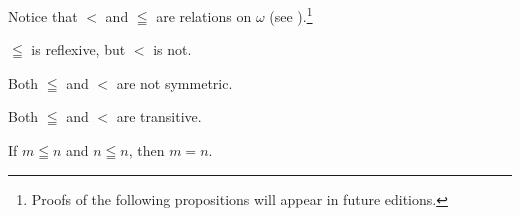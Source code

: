 Notice that $<$ and $\leqq$ are relations on $\omega $ (see ).\footnote{Proofs of the following propositions will appear in future editions.}

\begin{proposition}[Reflexivity]
$\leqq$ is reflexive, but
$<$ is not.
\end{proposition}

\begin{proposition}[Symmetry]
Both $\leqq$ and $<$ are not symmetric.
\end{proposition}

\begin{proposition}[Transitivity]
Both $\leqq$ and $<$ are transitive.
\end{proposition}

\begin{proposition}[Antisymmetry]
If $m \leqq n$ and $n \leqq n$, then $m = n$.
\end{proposition}


